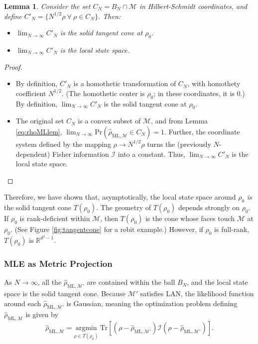 \documentclass[aps,pra, twocolumn]{revtex4-1}
\newcommand{\M}{\mathcal{M}}
\newcommand{\rhohat}{\hat{\rho}}
\newcommand{\rhoML}[1]{\rhohat_{\scriptscriptstyle{\mathrm{ML},#1}}}
\newtheorem{lem}{Lemma}
\begin{document}
\begin{lem}Consider the set $C_{N} = B_{N} \cap \M$ in Hilbert-Schmidt coordinates, and define $C'_{N} = \{N^{1/2}\rho~\forall~\rho \in C_{N}\}$. Then:
\begin{itemize}
\item [1)] $\lim_{N\rightarrow \infty}C'_{N}$ is the solid tangent cone at $\rho_{0}$.
\item [2)] $\lim_{N\rightarrow \infty}C'_{N}$ is the local state space.
\end{itemize}
\end{lem}
\begin{proof}~\\
\begin{itemize}
\item [1)] By definition, $C'_{N}$ is a homothetic transformation of $C_{N}$, with homothety coefficient $N^{1/2}$. (The homothetic center is $\rho_{0}$; in these coordinates, it is 0.) By definition, $\lim_{N\rightarrow \infty}C'_{N}$ is the solid tangent cone at $\rho_{0}$.
\item [2)] The original set $C_{N}$ is a convex subset of $\M$, and from Lemma \ref{eq:rhoMLlem}, $\lim_{N\rightarrow \infty}\mathrm{Pr}(\rhoML{\M} \in C_{N}) = 1$.  Further, the coordinate system defined by the mapping $\rho \rightarrow N^{1/2}\rho$ turns the (previously $N$-dependent) Fisher information $\mathcal{I}$ into a constant. Thus, $\lim_{N\rightarrow \infty}C'_{N}$ is the local state space.
\end{itemize}
\end{proof}

Therefore, we have shown that, asymptotically, the local state space around $\rho_{0}$ \emph{is} the solid tangent cone $T(\rho_{0})$.
The geometry of $T(\rho_{0})$ depends strongly on $\rho_{0}$. If $\rho_{0}$ is rank-deficient within $\M$, then $T(\rho_{0})$ is the cone whose faces touch $\M$ at $\rho_{0}$. (See Figure \ref{fig:tangentcone} for a rebit example.) However, if $\rho_{0}$ is full-rank, $T(\rho_{0})$ is $\mathbb{R}^{d^{2}-1}$.

\subsubsection{MLE as Metric Projection}

As $N \rightarrow \infty$, all the $\rhoML{\M'}$ are contained within the ball $B_{N}$, and the local state space is the solid tangent cone. Because $\M'$ satisfies LAN, the likelihood function around each $\rhoML{\M'}$ is Gaussian, meaning the optimization problem defining $\rhoML{\M}$ is given by \begin{equation}
\label{eq:MP-LANmle2}
\rhoML{\M} = \underset{\rho \in T(\rho_{0})}{\text{argmin}}~\mathrm{Tr}[(\rho  -\rhoML{\M'})\mathcal{I}(\rho  -\rhoML{\M'})].
\end{equation}
\end{document}
